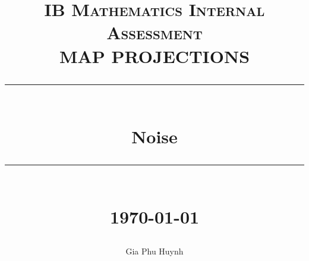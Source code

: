 \documentclass[10pt]{article}
\title{ 
    \normalsize \textsc{IB Mathematics Internal Assessment} \\ [2.5cm]

	\LARGE MAP PROJECTIONS
	\rule{\linewidth}{0.5pt} \\
	\Large \textbf{Noise}
	\rule{\linewidth}{1pt} \\ [1cm]
	\normalsize \today \vspace*{5\baselineskip}
}
\date{}
\author{Gia Phu Huynh}
\begin{document}
\maketitle

\pagebreak
\tableofcontents

\pagebreak
\raggedright

\end{document}
